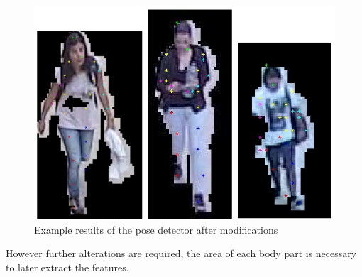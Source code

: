 \documentclass[titlepage,12pt,a4paper,times]{book}
\begin{document}
\begin{figure}[!h]
\centering
\includegraphics[scale=0.63]{images/3_3_fig2.jpg}
\caption{Example results of the pose detector after modifications}
\label{fig:erpdm}
\end{figure}
\FloatBarrier

However further alterations are required, the area of each body part is
necessary to later extract the features.
\end{document}
